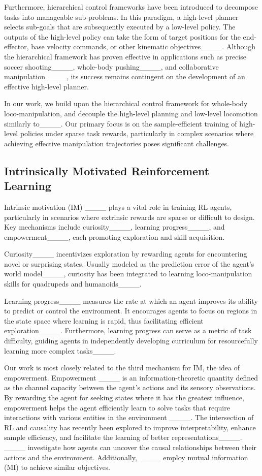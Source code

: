 Furthermore, hierarchical control frameworks have been introduced to decompose tasks into manageable sub-problems. 
In this paradigm, a high-level planner selects sub-goals that are subsequently executed by a low-level policy.
The outputs of the high-level policy can take the form of target positions for the end-effector, base velocity commands, or other kinematic objectives____.
Although the hierarchical framework has proven effective in applications such as precise soccer shooting____, whole-body pushing____, and collaborative manipulation____, its success remains contingent on the development of an effective high-level planner.

In our work, we build upon the hierarchical control framework for whole-body loco-manipulation, and decouple the high-level planning and low-level locomotion similarly to____. 
Our primary focus is on the sample-efficient training of high-level policies under sparse task rewards, particularly in complex scenarios where achieving effective manipulation trajectories poses significant challenges.

\subsection{Intrinsically Motivated Reinforcement Learning}
Intrinsic motivation (IM) ____ plays a vital role in training RL agents, particularly in scenarios where extrinsic rewards are sparse or difficult to design.
Key mechanisms include curiosity____, 
learning progress____, and empowerment____, each promoting exploration and skill acquisition. 

Curiosity____ incentivizes exploration by rewarding agents for encountering novel or surprising states. 
Usually modeled as the prediction error of the agent's world model____, 
curiosity has been integrated to learning loco-manipulation skills for quadrupeds and humanoids____.

Learning progress____ measures the rate at which an agent improves its ability to predict or control the environment.
It encourages agents to focus on regions in the state space where learning is rapid, thus facilitating efficient exploration____. 
Furthermore, learning progress can serve as a metric of task difficulty, guiding agents in independently developing curriculum for resourcefully learning more complex tasks____.

Our work is most closely related to the third mechanism for IM, the idea of empowerment. 
Empowerment ____ is an information-theoretic quantity defined as the channel capacity between the agent's actions and its sensory observations. 
By rewarding the agent for seeking states where it has the greatest influence, empowerment helps the agent efficiently learn to solve tasks that require interactions with various entities in the environment ____.
The intersection of RL and causality has recently been explored to improve interpretability, enhance sample efficiency, and facilitate the learning of better representations____. 
____ investigate how agents can uncover the causal relationships between their actions and the environment.
Additionally, ____ employ mutual information (MI) to achieve similar objectives. 

